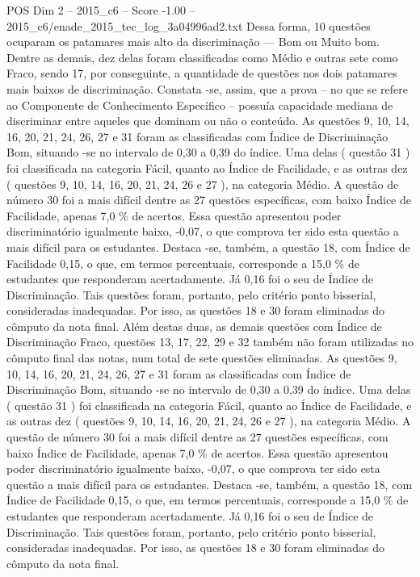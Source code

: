 \begin{textsample}{POS Dim 2 – 2015\_c6 – Score -1.00 – 2015\_c6/enade\_2015\_tec\_log\_3a04996ad2.txt}
Dessa forma, 10 questões ocuparam os patamares mais alto da discriminação — Bom ou Muito bom.
Dentre as demais, dez delas foram classificadas como Médio e outras sete como Fraco, sendo 17, por conseguinte, a quantidade de questões nos dois patamares mais baixos de discriminação.
Constata -se, assim, que a prova – no que se refere ao Componente de Conhecimento Específico – possuía capacidade mediana de discriminar entre aqueles que dominam ou não o conteúdo.
As questões 9, 10, 14, 16, 20, 21, 24, 26, 27 e 31 foram as classificadas com Índice de Discriminação Bom, situando -se no intervalo de 0,30 a 0,39 do índice.
Uma delas ( questão 31 ) foi classificada na categoria Fácil, quanto ao Índice de Facilidade, e as outras dez ( questões 9, 10, 14, 16, 20, 21, 24, 26 e 27 ), na categoria Médio.
A questão de número 30 foi a mais difícil dentre as 27 questões específicas, com baixo Índice de Facilidade, apenas 7,0 \% de acertos.
Essa questão apresentou poder discriminatório igualmente baixo, -0,07, o que comprova ter sido esta questão a mais difícil para os estudantes.
Destaca -se, também, a questão 18, com Índice de Facilidade 0,15, o que, em termos percentuais, corresponde a 15,0 \% de estudantes que responderam acertadamente.
Já 0,16 foi o seu de Índice de Discriminação.
Tais questões foram, portanto, pelo critério ponto bisserial, consideradas inadequadas.
Por isso, as questões 18 e 30 foram eliminadas do cômputo da nota final.
Além destas duas, as demais questões com Índice de Discriminação Fraco, questões 13, 17, 22, 29 e 32 também não foram utilizadas no cômputo final das notas, num total de sete questões eliminadas.
As questões 9, 10, 14, 16, 20, 21, 24, 26, 27 e 31 foram as classificadas com Índice de Discriminação Bom, situando -se no intervalo de 0,30 a 0,39 do índice.
Uma delas ( questão 31 ) foi classificada na categoria Fácil, quanto ao Índice de Facilidade, e as outras dez ( questões 9, 10, 14, 16, 20, 21, 24, 26 e 27 ), na categoria Médio.
A questão de número 30 foi a mais difícil dentre as 27 questões específicas, com baixo Índice de Facilidade, apenas 7,0 \% de acertos.
Essa questão apresentou poder discriminatório igualmente baixo, -0,07, o que comprova ter sido esta questão a mais difícil para os estudantes.
Destaca -se, também, a questão 18, com Índice de Facilidade 0,15, o que, em termos percentuais, corresponde a 15,0 \% de estudantes que responderam acertadamente.
Já 0,16 foi o seu de Índice de Discriminação.
Tais questões foram, portanto, pelo critério ponto bisserial, consideradas inadequadas.
Por isso, as questões 18 e 30 foram eliminadas do cômputo da nota final.

\end{textsample}

